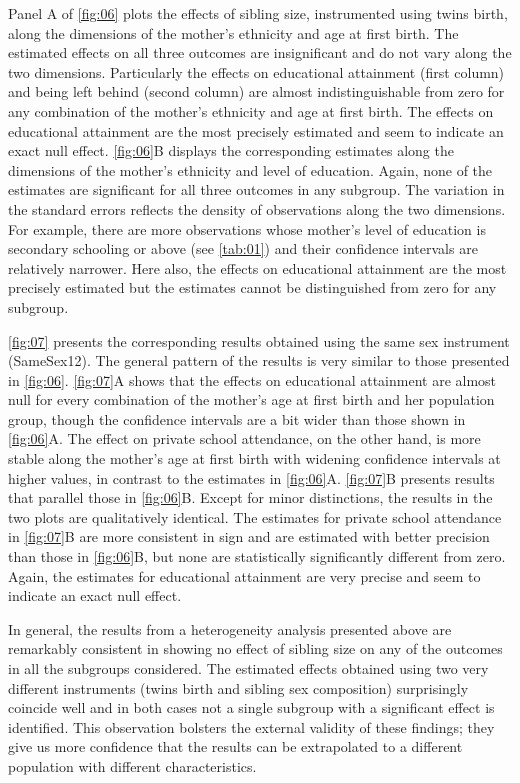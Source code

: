 Panel A of \autoref{fig:06} plots the effects of sibling size, instrumented using twins birth, along the dimensions of the mother's ethnicity and age at first birth. The estimated effects on all three outcomes are insignificant and do not vary along the two dimensions. Particularly the effects on educational attainment (first column) and being left behind (second column) are almost indistinguishable from zero for any combination of the mother's ethnicity and age at first birth. The effects on educational attainment are the most precisely estimated and seem to indicate an exact null effect. \autoref{fig:06}B displays the corresponding estimates along the dimensions of the mother's ethnicity and level of education. Again, none of the estimates are significant for all three outcomes in any subgroup. The variation in the standard errors reflects the density of observations along the two dimensions. For example, there are more observations whose mother’s level of education is secondary schooling or above (see \autoref{tab:01}) and their confidence intervals are relatively narrower. Here also, the effects on educational attainment are the most precisely estimated but the estimates cannot be distinguished from zero for any subgroup. 

\autoref{fig:07} presents the corresponding results obtained using the same sex instrument (SameSex12). The general pattern of the results is very similar to those presented in \autoref{fig:06}. \autoref{fig:07}A shows that the effects on educational attainment are almost null for every combination of the mother's age at first birth and her population group, though the confidence intervals are a bit wider than those shown in \autoref{fig:06}A. The effect on private school attendance, on the other hand, is more stable along the mother's age at first birth with widening confidence intervals at higher values, in contrast to the estimates in \autoref{fig:06}A. \autoref{fig:07}B presents results that parallel those in \autoref{fig:06}B. Except for minor distinctions, the results in the two plots are qualitatively identical. The estimates for private school attendance in \autoref{fig:07}B are more consistent in sign and are estimated with better precision than those in \autoref{fig:06}B, but none are statistically significantly different from zero. Again, the estimates for educational attainment are very precise and seem to indicate an exact null effect. 

In general, the results from a heterogeneity analysis presented above are remarkably consistent in showing no effect of sibling size on any of the outcomes in all the subgroups considered. The estimated effects obtained using two very different instruments (twins birth and sibling sex composition) surprisingly coincide well and in both cases not a single subgroup with a significant effect is identified. This observation bolsters the external validity of these findings; they give us more confidence that the results can be extrapolated to a different population with different characteristics. 


